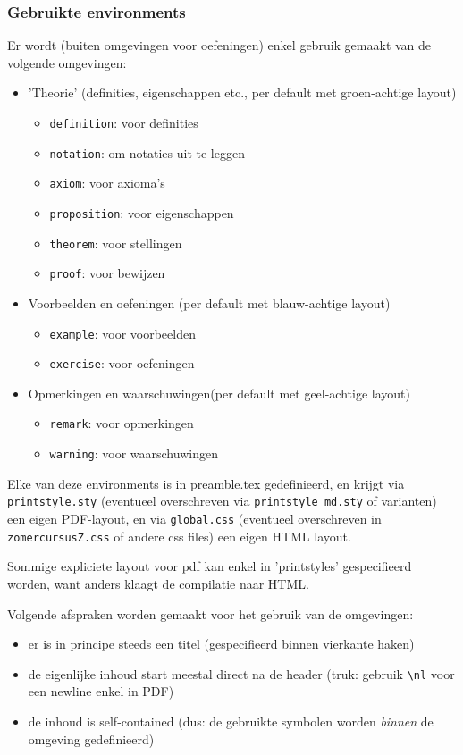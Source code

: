 \documentclass{ximera}
\begin{document}
\subsubsection{Gebruikte environments}
Er wordt (buiten omgevingen voor oefeningen) enkel gebruik gemaakt van de volgende omgevingen:
   \begin{itemize}
   \item 'Theorie' (definities, eigenschappen etc., per default met groen-achtige layout)
   \begin{itemize} 
       \item \verb|definition|: voor definities
       \item \verb|notation|: om notaties uit te leggen
       \item \verb|axiom|: voor axioma's
       \item \verb|proposition|: voor eigenschappen
       \item \verb|theorem|: voor stellingen
       \item \verb|proof|: voor bewijzen
   \end{itemize}
   \item  Voorbeelden en oefeningen (per default met blauw-achtige layout)
   \begin{itemize}
       \item \verb|example|: voor voorbeelden
       \item \verb|exercise|: voor oefeningen

   \end{itemize}
   \item Opmerkingen en waarschuwingen(per default met geel-achtige layout)
   \begin{itemize} 
       \item \verb|remark|: voor opmerkingen
       \item \verb|warning|: voor waarschuwingen
   \end{itemize}
   \end{itemize}
Elke van deze environments is in preamble.tex gedefinieerd, en krijgt via \verb|printstyle.sty| (eventueel overschreven via \verb|printstyle_md.sty| of varianten) een eigen PDF-layout, en via \verb|global.css| (eventueel overschreven in \verb|zomercursusZ.css| of andere css files) een eigen HTML layout. 

Sommige expliciete layout voor pdf kan enkel in 'printstyles' gespecifieerd worden, want anders klaagt de compilatie naar HTML.

Volgende afspraken worden gemaakt voor het gebruik van de omgevingen:
\begin{itemize}
	\item er is in principe steeds een titel (gespecifieerd binnen vierkante haken)
	\item de eigenlijke inhoud start meestal direct na de header (truk: gebruik \verb|\nl| voor een newline enkel in PDF)
	\item de inhoud is self-contained (dus: de gebruikte symbolen worden \textit{binnen} de omgeving gedefinieerd) 
\end{itemize}
\end{document}
